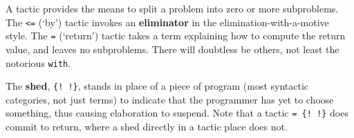 \documentclass{article}
\begin{document}
A tactic provides the means to split a problem into zero or more
subproblems. The \texttt{<=} (`by') tactic invokes an \textbf{eliminator}
in the elimination-with-a-motive style. The \texttt{=} (`return') tactic
takes a term explaining how to compute the return value, and leaves no
subproblems. There will doubtless be others, not least the notorious
\texttt{with}.

The \textbf{shed}, \texttt{\{! !\}}, stands in place of a piece of program
(most syntactic categories, not just terms) to indicate that the programmer
has yet to choose something, thus causing elaboration to suspend. Note
that a tactic \texttt{= \{! !\}} does commit to return, where a
shed directly in a tactic place does not.
\end{document}
